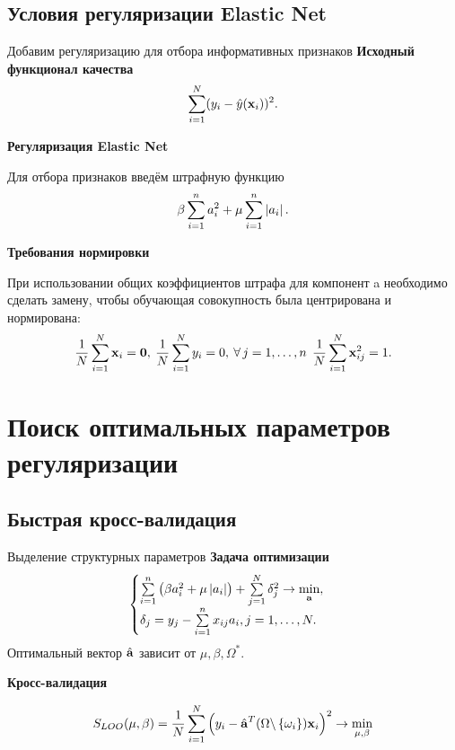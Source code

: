 \documentclass[unicode,lefteqn,c,hyperref={pdfpagelabels=false}]{beamer}
\begin{document}
\subsection{Условия регуляризации Elastic Net}
\begin{frame}{Добавим регуляризацию для отбора информативных признаков}
	\vspace{-5pt}
	\textbf{Исходный функционал качества}
	\vspace{-5pt}
	\begin{equation*}
		\sum\limits_{i=1}^N(y_i - \hat y(\boldsymbol{\mathbf{x}}_i))^2.
	\end{equation*}

	\smallskip
	\textbf{Регуляризация Elastic Net}

	Для отбора признаков введём штрафную функцию
	\begin{equation*}
		\beta\sum\limits_{i=1}^n a_i^2 + \mu\sum\limits_{i=1}^n\left|a_i\right|.
	\end{equation*}

	\smallskip
	\textbf{Требования нормировки}

	При использовании общих коэффициентов штрафа для компонент \mb a необходимо сделать замену, чтобы обучающая совокупность была центрирована и нормирована:
	\begin{equation*}
		\frac1N\sum\limits_{i=1}^N\boldsymbol{\mathbf{x}}_i = \boldsymbol{\mathbf{0}}, \:
		\frac1N\sum\limits_{i=1}^N y_i = 0, \:
		\forall\,j=1,\ldots, n\: \: \frac1N\sum\limits_{i=1}^N\boldsymbol{\mathbf{x}}_{ij}^2 = 1.
	\end{equation*}
\end{frame}

\def\lams{{\mu,\beta}}
\section{Поиск оптимальных параметров регуляризации}
\subsection{Быстрая кросс-валидация}
\begin{frame}{Выделение структурных параметров}
	\textbf{Задача оптимизации}
	\begin{equation*}
		\begin{cases}
			\sum\limits_{i=1}^n\left(\beta a_i^2 + \mu \left|a_i\right|\right)
			+ \sum\limits_{j=1}^N \delta_j^2 \to \mathop{\mbox{min}}\limits_{\boldsymbol{\mathbf{a}}}, \\
			\delta_j = y_j - \sum\limits_{i=1}^nx_{ij}a_i, j=1,\ldots,N.
		\end{cases}
	\end{equation*}
	Оптимальный вектор $\hat{\boldsymbol{\mathbf{a}}}$ зависит от $\lams, \Omega^*.$

	\smallskip
	\textbf{Кросс-валидация}

	\begin{equation*}
		S_{LOO}(\lams) = \frac1N\suml_{i=1}^N\cbr{y_i - \hat{\mb a}^T(\Omega \backslash \fbr{\omega_i})\mb x_i}^2 \to \min_{\lams}
	\end{equation*}
\end{frame}
\end{document}
